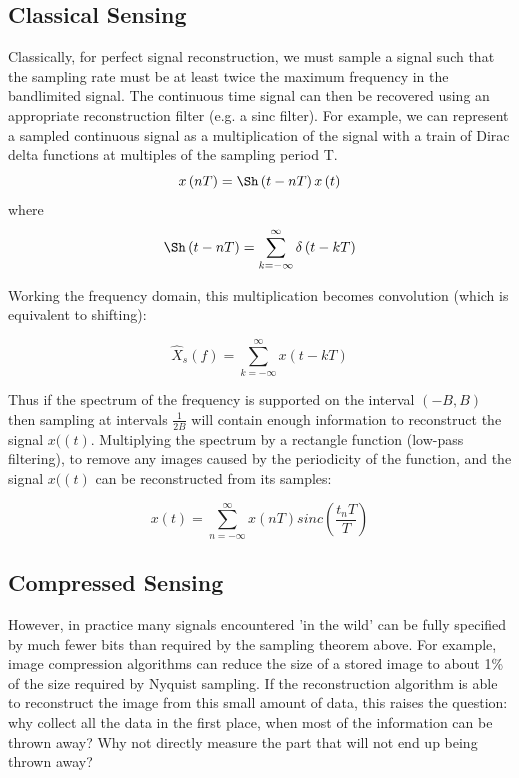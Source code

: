 \documentclass[conference]{IEEEtran}
\begin{document}
\subsection{Classical Sensing}
Classically, for perfect signal reconstruction, we must sample a signal such that the sampling rate must be at least twice the maximum frequency in the bandlimited signal. The continuous time signal can then be recovered using an appropriate reconstruction filter (e.g. a sinc filter). For example, we can represent a sampled continuous signal as a multiplication of the signal with a train of Dirac delta functions at multiples of the sampling period T.
%
\begin{equation}
x\left(nT\right) = \Sh\left(t-nT\right)x\left(t\right)
\end{equation}
%
where
%
\begin{equation}
\Sh\left(t-nT\right) = \sum_{k=-\infty}^{\infty} \delta\left(t - kT\right)
\end{equation}

Working the frequency domain, this multiplication becomes convolution (which is equivalent to shifting):

\begin{equation}
\hat{X}_{s}\left(f\right) = \sum_{k=-\infty}^\infty x\left(t - kT\right)
\end{equation}

Thus if the spectrum of the frequency is supported on the interval \(\left(-B, B\right)\) then sampling at intervals \(\frac{1}{2B}\) will contain enough information to reconstruct the signal \(x(\left(t\right)\). Multiplying the spectrum by a rectangle function (low-pass filtering), to remove any images caused by the periodicity of the function, and the signal \(x(\left(t\right)\) can be reconstructed from its samples:

\begin{equation}
x\left(t\right) = \sum_{n=-\infty}^\infty x\left(nT\right) sinc\left(\frac{t_nT}{T}\right)
\end{equation}

\subsection{Compressed Sensing}

However, in practice many signals encountered 'in the wild' can be fully specified by much fewer bits than required by the sampling theorem above. For example, image compression algorithms can reduce the size of a stored image to about 1\% of the size required by Nyquist sampling. If the reconstruction algorithm is able to reconstruct the image from this small amount of data, this raises the question: why collect all the data in the first place, when most of the information can be thrown away? Why not directly measure the part that will not end up being thrown away?
\end{document}
